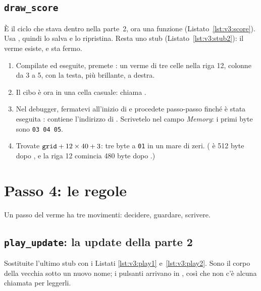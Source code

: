 \subsection{\texttt{draw\_score}}


È il ciclo che stava dentro  nella parte~2, ora una funzione
(Listato~\ref{lst:v3:score}). Usa , quindi lo salva e lo ripristina.
Resta uno stub (Listato~\ref{lst:v3:stub2}): il verme esiste, e sta fermo.


\begin{prgcheck}
\begin{enumerate}[nosep]
\item Compilate ed eseguite, premete : un verme di tre celle nella riga
  12, colonne da 3 a 5, con la testa, più brillante, a destra.
\item Il cibo è ora in una cella casuale:  chiama
  .
\item Nel debugger, fermatevi all'inizio di  e procedete
  passo-passo finché è stata eseguita :  contiene
  l'indirizzo di . Scrivetelo nel campo \emph{Memory}: i primi
  byte sono \texttt{03 04 05}.
\item Trovate $\texttt{grid}+12\times 40+3$: tre byte a \texttt{01} in un mare di
  zeri. ( è 512 byte dopo , e la riga 12 comincia 480
  byte dopo .)
\end{enumerate}
\end{prgcheck}

\section{Passo 4: le regole}

Un passo del verme ha tre movimenti: decidere, guardare, scrivere.

\subsection{\texttt{play\_update}: la update della parte 2}

Sostituite l'ultimo stub con i Listati \ref{lst:v3:play1}
e~\ref{lst:v3:play2}. Sono il corpo della vecchia  sotto un
nuovo nome; i pulsanti arrivano in , così che non c'è alcuna chiamata
per leggerli.

